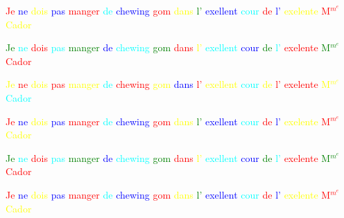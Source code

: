 \documentclass[12pt,a4paper]{article}
\begin{document}
\textcolor{red}{Je} \textcolor{blue}{ne} \textcolor{yellow}{dois} \textcolor{blue}{pas} \textcolor{red}{manger} \textcolor{cyan}{de} \textcolor{blue}{chewing} \textcolor{red}{gom} \textcolor{yellow}{dans} \textcolor{green}{l'} \textcolor{blue}{exellent} \textcolor{cyan}{cour} \textcolor{red}{de} \textcolor{blue}{l'} \textcolor{yellow}{exelente} \textcolor{red}{M$^m^e$} \textcolor{yellow}{Cador}

\textcolor{green}{Je} \textcolor{cyan}{ne} \textcolor{red}{dois} \textcolor{cyan}{pas} \textcolor{green}{manger} \textcolor{blue}{de} \textcolor{cyan}{chewing} \textcolor{green}{gom} \textcolor{red}{dans} \textcolor{yellow}{l'} \textcolor{cyan}{exellent} \textcolor{blue}{cour} \textcolor{green}{de} \textcolor{cyan}{l'} \textcolor{red}{exelente} \textcolor{green}{M$^m^e$} \textcolor{red}{Cador}

\textcolor{yellow}{Je} \textcolor{red}{ne} \textcolor{yellow}{dois} \textcolor{red}{pas} \textcolor{yellow}{manger} \textcolor{cyan}{de} \textcolor{red}{chewing} \textcolor{yellow}{gom} \textcolor{blue}{dans} \textcolor{red}{l'} \textcolor{yellow}{exellent} \textcolor{cyan}{cour} \textcolor{yellow}{de} \textcolor{red}{l'} \textcolor{red}{exelente} \textcolor{yellow}{M$^m^e$} \textcolor{cyan}{Cador}

\textcolor{red}{Je} \textcolor{blue}{ne} \textcolor{yellow}{dois} \textcolor{blue}{pas} \textcolor{red}{manger} \textcolor{cyan}{de} \textcolor{blue}{chewing} \textcolor{red}{gom} \textcolor{yellow}{dans} \textcolor{green}{l'} \textcolor{blue}{exellent} \textcolor{cyan}{cour} \textcolor{red}{de} \textcolor{blue}{l'} \textcolor{yellow}{exelente} \textcolor{red}{M$^m^e$} \textcolor{yellow}{Cador}

\textcolor{green}{Je} \textcolor{cyan}{ne} \textcolor{red}{dois} \textcolor{cyan}{pas} \textcolor{green}{manger} \textcolor{blue}{de} \textcolor{cyan}{chewing} \textcolor{green}{gom} \textcolor{red}{dans} \textcolor{yellow}{l'} \textcolor{cyan}{exellent} \textcolor{blue}{cour} \textcolor{green}{de} \textcolor{cyan}{l'} \textcolor{red}{exelente} \textcolor{green}{M$^m^e$} \textcolor{red}{Cador}

\textcolor{red}{Je} \textcolor{blue}{ne} \textcolor{yellow}{dois} \textcolor{blue}{pas} \textcolor{red}{manger} \textcolor{cyan}{de} \textcolor{blue}{chewing} \textcolor{red}{gom} \textcolor{yellow}{dans} \textcolor{green}{l'} \textcolor{blue}{exellent} \textcolor{cyan}{cour} \textcolor{red}{de} \textcolor{blue}{l'} \textcolor{yellow}{exelente} \textcolor{red}{M$^m^e$} \textcolor{yellow}{Cador}
\end{document}
